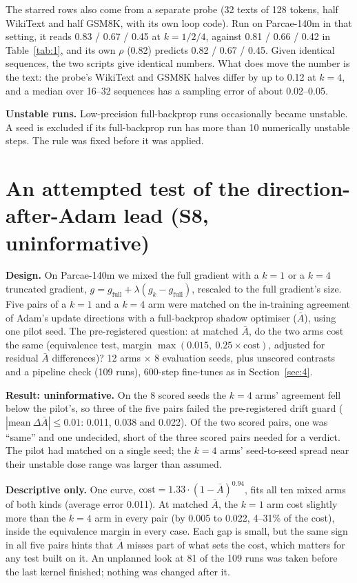 \documentclass[10pt]{article}
\begin{document}
The starred rows also come from a separate probe (32 texts of 128 tokens, half WikiText and half GSM8K, with its own loop code). Run on Parcae-140m in that setting, it reads 0.83 / 0.67 / 0.45 at $k = 1 / 2 / 4$, against 0.81 / 0.66 / 0.42 in Table~\ref{tab:1}, and its own $\rho$ (0.82) predicts 0.82 / 0.67 / 0.45. Given identical sequences, the two scripts give identical numbers. What does move the number is the text: the probe's WikiText and GSM8K halves differ by up to 0.12 at $k = 4$, and a median over 16--32 sequences has a sampling error of about 0.02--0.05.

\textbf{Unstable runs.} Low-precision full-backprop runs occasionally became unstable. A seed is excluded if its full-backprop run has more than 10 numerically unstable steps. The rule was fixed before it was applied.

\section{An attempted test of the direction-after-Adam lead (S8, uninformative)}\label{app:G}

\textbf{Design.} On Parcae-140m we mixed the full gradient with a $k = 1$ or a $k = 4$ truncated gradient, $g = g_\mathrm{full} + \lambda(g_k - g_\mathrm{full})$, rescaled to the full gradient's size. Five pairs of a $k = 1$ and a $k = 4$ arm were matched on the in-training agreement of Adam's update directions with a full-backprop shadow optimiser ($\bar{A}$), using one pilot seed. The pre-registered question: at matched $\bar{A}$, do the two arms cost the same (equivalence test, margin $\max(0.015,\ 0.25\times\mathrm{cost})$, adjusted for residual $\bar{A}$ differences)? 12 arms $\times$ 8 evaluation seeds, plus unscored contrasts and a pipeline check (109 runs), 600-step fine-tunes as in Section~\ref{sec:4}.

\textbf{Result: uninformative.} On the 8 scored seeds the $k = 4$ arms' agreement fell below the pilot's, so three of the five pairs failed the pre-registered drift guard ($|\text{mean}\ \Delta\bar{A}| \leq 0.01$: 0.011, 0.038 and 0.022). Of the two scored pairs, one was ``same'' and one undecided, short of the three scored pairs needed for a verdict. The pilot had matched on a single seed; the $k = 4$ arms' seed-to-seed spread near their unstable dose range was larger than assumed.

\textbf{Descriptive only.} One curve, $\mathrm{cost} = 1.33\cdot(1-\bar{A})^{0.94}$, fits all ten mixed arms of both kinds (average error 0.011). At matched $\bar{A}$, the $k = 1$ arm cost slightly more than the $k = 4$ arm in every pair (by 0.005 to 0.022, 4--31\% of the cost), inside the equivalence margin in every case. Each gap is small, but the same sign in all five pairs hints that $\bar{A}$ misses part of what sets the cost, which matters for any test built on it. An unplanned look at 81 of the 109 runs was taken before the last kernel finished; nothing was changed after it.
\end{document}
